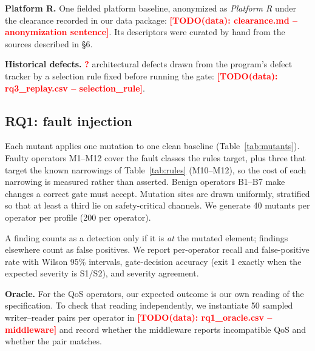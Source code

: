 \documentclass[sigconf,screen]{acmart}
\newcommand{\TODOdata}[1]{\textcolor{red}{\textbf{[TODO(data): #1]}}}
\newcommand{\tbd}{\textcolor{red}{\textbf{?}}}
\begin{document}
\noindent\textbf{Platform R.} One fielded platform baseline, anonymized as \emph{Platform R} under the clearance recorded in our data package: \TODOdata{clearance.md -- anonymization sentence}. Its descriptors were curated by hand from the sources described in \S6.

\noindent\textbf{Historical defects.} \tbd{} architectural defects drawn from the program's defect tracker by a selection rule fixed before running the gate: \TODOdata{rq3\_replay.csv -- selection\_rule}.

\subsection{RQ1: fault injection}
Each mutant applies one mutation to one clean baseline (Table~\ref{tab:mutants}). Faulty operators M1--M12 cover the fault classes the rules target, plus three that target the known narrowings of Table~\ref{tab:rules} (M10--M12), so the cost of each narrowing is measured rather than asserted. Benign operators B1--B7 make changes a correct gate must accept. Mutation sites are drawn uniformly, stratified so that at least a third lie on safety-critical channels. We generate 40 mutants per operator per profile (200 per operator).

A finding counts as a detection only if it is \emph{at} the mutated element; findings elsewhere count as false positives. We report per-operator recall and false-positive rate with Wilson 95\% intervals, gate-decision accuracy (exit 1 exactly when the expected severity is S1/S2), and severity agreement.

\noindent\textbf{Oracle.} For the QoS operators, our expected outcome is our own reading of the specification. To check that reading independently, we instantiate 50 sampled writer--reader pairs per operator in \TODOdata{rq1\_oracle.csv -- middleware} and record whether the middleware reports incompatible QoS and whether the pair matches.
\end{document}
